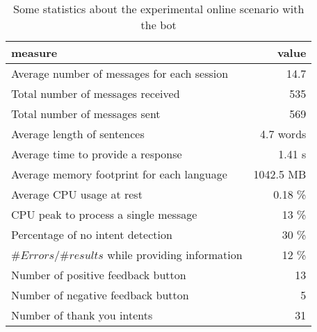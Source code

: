 
\begin{table}
  \begin{tabularx}{\textwidth}{Xr}
    \toprule
    \textbf{measure} & \textbf{value} \\
    \midrule
    Average number of messages for each session & 14.7 \\
    Total number of messages received & 535 \\
    Total number of messages sent & 569 \\
    Average length of sentences & 4.7 words \\
    Average time to provide a response & 1.41 s \\
    Average memory footprint for each language & 1042.5 MB \\
    Average CPU usage at rest & 0.18 \% \\
    CPU peak to process a single message & 13 \% \\
    Percentage of no intent detection & 30 \% \\
    $\#Errors/\#results$ while providing information & 12 \% \\
    Number of positive feedback button & 13 \\
    Number of negative feedback button & 5 \\
    Number of thank you intents & 31 \\
    \bottomrule
  \end{tabularx}
  \caption{Some statistics about the experimental online scenario with the bot}\label{tab:botStatistics}
\end{table}
